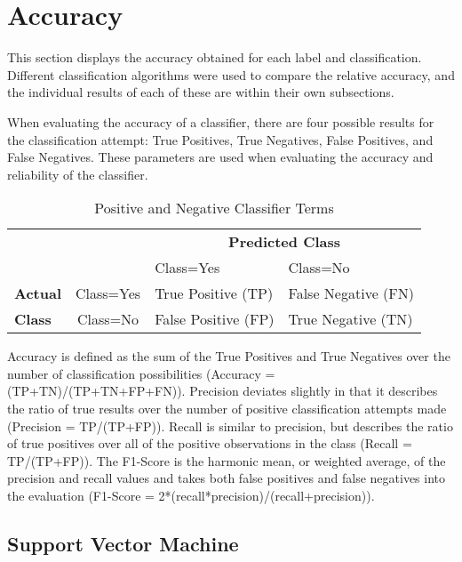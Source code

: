 \section{Accuracy}

This section displays the accuracy obtained for each label and classification. Different classification algorithms were used to compare the relative accuracy, and the individual results of each of these are within their own subsections.

When evaluating the accuracy of a classifier, there are four possible results for the classification attempt: True Positives, True Negatives, False Positives, and False Negatives. These parameters are used when evaluating the accuracy and reliability of the classifier.

\begin{table}[H]
    \centering
    \caption{Positive and Negative Classifier Terms}
    \begin{tabular}{b{1cm} b{2.5cm} b{3.5cm} b{3.5cm}}
        \toprule
        \multicolumn{2}{c}{} &
        \multicolumn{2}{c}{\textbf{Predicted Class}}\\
        \cmidrule(lr){3-4}
        \rowcolor{White}\textbf{} & {\textbf{}} & {Class=Yes} & {Class=No} \\
        \midrule
        \textbf{Actual} & \multicolumn{1}{c}{Class=Yes} & {True Positive (TP)} & {False Negative (FN)}\\
        \rowcolor{White}\textbf{Class} & \multicolumn{1}{c}{Class=No} & {False Positive (FP)} & {True Negative (TN)}\\
        \bottomrule
    \end{tabular}
\end{table}

Accuracy is defined as the sum of the True Positives and True Negatives over the number of classification possibilities (Accuracy = (TP+TN)/(TP+TN+FP+FN)). Precision deviates slightly in that it describes the ratio of true results over the number of positive classification attempts made (Precision = TP/(TP+FP)). Recall is similar to precision, but describes the ratio of true positives over all of the positive observations in the class (Recall = TP/(TP+FP)). The F1-Score is the harmonic mean, or weighted average, of the precision and recall values and takes both false positives and false negatives into the evaluation (F1-Score = 2*(recall*precision)/(recall+precision)).

\subsection{Support Vector Machine}

